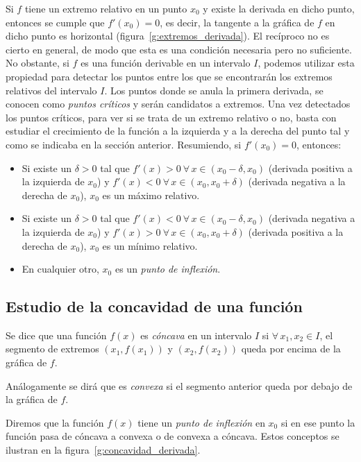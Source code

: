 Si $f$ tiene un extremo relativo en un punto $x_0$ y existe la
derivada en dicho punto, entonces se cumple que $f'(x_0)=0$, es
decir, la tangente a la gráfica de $f$ en dicho punto es horizontal
(figura~\ref{g:extremos_derivada}). El recíproco no es cierto en general, de
modo que esta es una condición necesaria pero no suficiente. No
obstante, si $f$ es una función derivable en un intervalo $I$,
podemos utilizar esta propiedad para detectar los puntos entre los
que se encontrarán los extremos relativos del intervalo $I$. Los
puntos donde se anula la primera derivada, se conocen como
\emph{puntos críticos} y serán candidatos a extremos. Una vez
detectados los puntos críticos, para ver si se trata de un extremo
relativo o no, basta con estudiar el crecimiento de la función a la
izquierda y a la derecha del punto tal y como se indicaba en la
sección anterior. Resumiendo, si $f'(x_0)=0$, entonces:
\begin{itemize}
\item Si existe un $\delta>0$ tal que $f'(x)>0\ \forall\, x\in (x_0-\delta,x_0)$ (derivada positiva a la izquierda de $x_0$) y $f'(x)<0\ \forall\, x\in (x_0,x_0+\delta)$ (derivada negativa a la derecha de $x_0$), $x_0$ es un máximo relativo.

\item Si existe un $\delta>0$ tal que $f'(x)<0\ \forall\, x\in (x_0-\delta,x_0)$ (derivada negativa a la izquierda de $x_0$) y $f'(x)>0\ \forall\, x\in (x_0,x_0+\delta)$ (derivada positiva a la derecha de $x_0$), $x_0$ es un mínimo relativo.

\item En cualquier otro, $x_0$ es un \emph{punto de inflexión}.
\end{itemize}

\subsection{Estudio de la concavidad de una función}
Se dice que una función $f(x)$ es \emph{cóncava} en un intervalo $I$
si $\forall\, x_1, x_2 \in I$, el segmento de extremos
$(x_1,f(x_1))$ y $(x_2,f(x_2))$ queda por encima de la gráfica de
$f$.

Análogamente se dirá que es \emph{convexa} si el segmento anterior
queda por debajo de la gráfica de $f$.

Diremos que la función $f(x)$ tiene un \emph{punto de inflexión} en
$x_0$ si en ese punto la función pasa de cóncava a convexa o de
convexa a cóncava. Estos conceptos se ilustran en la
figura~\ref{g:concavidad_derivada}.

